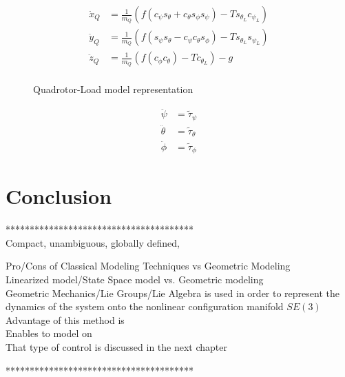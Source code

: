 \begin{equation}\label{key}
\begin{aligned}
\ddot{x}_Q&=\frac{1}{m_Q}(f(c_{\psi}s_{\theta}+c_{\theta}s_{\phi}s_{\psi})-Ts_{\theta_L}c_{\psi_L})\\
\ddot{y}_Q&=\frac{1}{m_Q}(f(s_{\psi}s_{\theta}-c_{\psi}c_{\theta}s_{\phi})-Ts_{\theta_L}s_{\psi_L})\\
\ddot{z}_Q&=\frac{1}{m_Q}(f(c_{\phi}c_{\theta})-Tc_{\theta_L})-g\\
\end{aligned}
\end{equation}

\begin{figure}[h!]
	\centering
	\caption{Quadrotor-Load model representation\label{fig:QRLmodelTrad}}
\end{figure}

\begin{align}\label{key}
	\ddot{\psi}&=\tilde{\tau}_{\psi}\\
\ddot{\theta}&=\tilde{\tau}_{\theta}\\
\ddot{\phi} &=\tilde{\tau}_{\phi}
\end{align}

\section{Conclusion}

***************************************\\
Compact, unambiguous, globally defined, 

Pro/Cons of Classical Modeling Techniques vs Geometric Modeling\\

Linearized model/State Space model vs. Geometric modeling\\


Geometric Mechanics/Lie Groups/Lie Algebra is used in order to represent the dynamics of the system onto the nonlinear configuration manifold $ SE(3) $\\
Advantage of this method is\\
Enables to model on \\
That type of control is discussed in the next chapter


***************************************\\